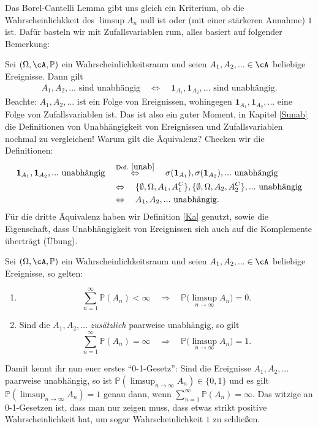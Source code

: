 Das Borel-Cantelli Lemma gibt uns gleich ein Kriterium, ob die Wahrscheinlichkkeit des $\limsup A_n$ null ist oder (mit einer st\"arkeren Annahme) $1$ ist. Daf\"ur basteln wir mit Zufallsvariablen rum, alles basiert auf folgender Bemerkung:
\begin{bem}\label{ereig}
	Sei $(\Omega, \cA, \mathbb{P})$ ein Wahrscheinlichkeitsraum und seien $A_1,A_2,... \in \cA$ beliebige Ereignisse. Dann gilt
	\begin{align*}
		A_1, A_2, ... \text{ sind unabh\"angig}\quad \Leftrightarrow\quad  \mathbf{1}_{A_1},\mathbf{1}_{A_2},... \text{ sind unabhängig}.
	\end{align*}
	Beachte: $A_1, A_2, ...$ ist ein Folge von Ereignissen, wohingegen $\mathbf{1}_{A_1},\mathbf{1}_{A_2},... $ eine Folge von Zufallsvariablen ist. Das ist also ein guter Moment, in Kapitel \ref{Sunab} die Definitionen von Unabh\"angigkeit von Ereignissen und Zufallsvariablen nochmal zu vergleichen! Warum gilt die \"Aquivalenz? Checken wir die Definitionen:
	\begin{align*}
		\mathbf{1}_{A_1},\mathbf{1}_{A_2},... \text{ unabh\"angig}\quad 
		&\overset{\text{Def. }\ref{unab}}{\Leftrightarrow} \quad \sigma(\mathbf{1}_{A_1}),\sigma(\mathbf{1}_{A_2}),... \text{ unabhängig}\\
		&\Leftrightarrow\quad \{ \emptyset, \Omega, A_1, A_1^C \},\{ \emptyset, \Omega, A_2, A_2^C \}, ... \text{ unabhängig}\\
		&\Leftrightarrow\quad A_1, A_2, ... \text{ unabh\"angig}.
	\end{align*}
F\"ur die dritte \"Aquivalenz haben wir Definition \ref{Ka} genutzt, sowie die Eigenschaft, dass Unabh\"angigkeit von Ereignissen sich auch auf die Komplemente \"ubertr\"agt (\"Ubung). 
	
	
\end{bem}

\begin{satz}\label{BC}
	Sei $(\Omega, \cA, \mathbb{P})$ ein Wahrscheinlichkeitsraum und seien $A_1,A_2,... \in \cA$ beliebige Ereignisse, so gelten:
	\begin{enumerate}[label=(\roman*)]
		\item \[ \sum\limits_{n = 1}^{\infty} \mathbb{P}(A_n) < \infty \quad \Rightarrow\quad  \mathbb{P}\big(\limsup\limits_{n \to \infty} A_n\big) =0. \]
		\item Sind die $A_1, A_2, ...$ \textit{zusätzlich} paarweise unabhängig, so gilt \[ \sum\limits_{n = 1}^{\infty} \mathbb{P}(A_n) = \infty \quad \Rightarrow \quad \mathbb{P}\big(\limsup\limits_{n \to \infty} A_n\big) = 1. \]
	\end{enumerate}
\end{satz}
	Damit kennt ihr nun euer erstes \enquote{0-1-Gesetz}: Sind die Ereignisse $A_1, A_2, ...$ paarweise unabh\"angig, so ist $\mathbb P(\limsup_{n\to\infty} A_n)\in \{0,1\}$ und es gilt $\mathbb P(\limsup_{n\to\infty}A_n)=1$ genau dann, wenn $\sum_{n=1}^\infty \mathbb P(A_n)=\infty$. Das witzige an 0-1-Gesetzen ist, dass man nur zeigen muss, dass etwas strikt positive Wahrscheinlichkeit hat, um sogar Wahrscheinlichkeit $1$ zu schlie\ss en. 

